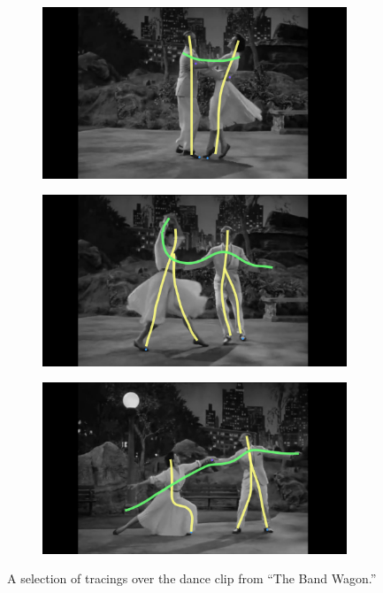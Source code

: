 \begin{figure}[h!]
	\centering
        \begin{subfigure}[b!]{0.31\textwidth}
        	\centering
                \includegraphics[width=\linewidth]{img/keyframe_case_4_(3)}
                \label{fig:pose1}
        \end{subfigure}
        \quad
        \begin{subfigure}[b!]{0.31\textwidth}
        	\centering
                \includegraphics[width=\linewidth]{img/keyframe_case_10_(5)}
                \label{fig:pose2}
        \end{subfigure}%
        \quad
        \begin{subfigure}[b!]{0.31\textwidth}
        	\centering
                \includegraphics[width=\linewidth]{img/keyframe_case_7_(4)}
                \label{fig:pose3}
        \end{subfigure}%
	\caption{A selection of tracings over the dance clip from ``The Band Wagon.''}
	\label{fig:tracing}
\end{figure}

